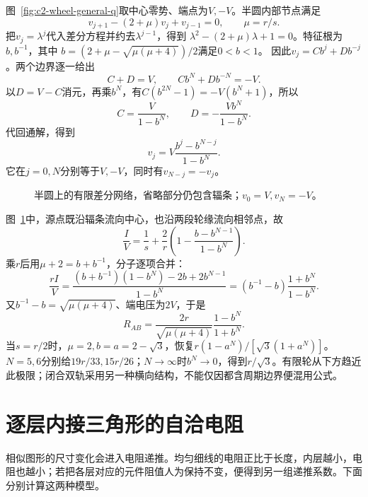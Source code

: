 \begin{solution}
图~\ref{fig:c2-wheel-general-q}取中心零势、端点为$V,-V$。半圆内部节点满足
\[
 v_{j+1}-(2+\mu)v_j+v_{j-1}=0,\qquad\mu=r/s.
\]
把$v_j=\lambda^j$代入差分方程并约去$\lambda^{j-1}$，得到
$\lambda^2-(2+\mu)\lambda+1=0$。特征根为$b,b^{-1}$，其中
$b=(2+\mu-\sqrt{\mu(\mu+4)})/2$满足$0<b<1$。
因此$v_j=C b^j+D b^{-j}$。两个边界逐一给出
\[
 C+D=V,\qquad Cb^N+Db^{-N}=-V.
\]
以$D=V-C$消元，再乘$b^N$，有$C(b^{2N}-1)=-V(b^N+1)$，所以
\[
 C=\frac{V}{1-b^N},\qquad D=-\frac{Vb^N}{1-b^N}.
\]
代回通解，得到
\[
 v_j=V\frac{b^j-b^{N-j}}{1-b^N}.
\]
它在$j=0,N$分别等于$V,-V$，同时有$v_{N-j}=-v_j$。
\begin{figure}[H]\centering
{}
\caption{半圆上的有限差分网络，省略部分仍包含辐条；$v_0=V,v_N=-V$。}\label{fig:c2-wheel-general-s}
\end{figure}
图~\ref{fig:c2-wheel-general-s}中，源点既沿辐条流向中心，也沿两段轮缘流向相邻点，故
\[
 \frac IV=\frac1s+\frac2r\left(1-\frac{b-b^{N-1}}{1-b^N}\right).
\]
乘$r$后用$\mu+2=b+b^{-1}$，分子逐项合并：
\[
 \frac{rI}V=
 \frac{(b+b^{-1})(1-b^N)-2b+2b^{N-1}}{1-b^N}
 =(b^{-1}-b)\frac{1+b^N}{1-b^N}.
\]
又$b^{-1}-b=\sqrt{\mu(\mu+4)}$、端电压为$2V$，于是
\[
 \boxed{R_{AB}=\frac{2r}{\sqrt{\mu(\mu+4)}}\frac{1-b^N}{1+b^N}}.
\]
当$s=r/2$时，$\mu=2,b=a=2-\sqrt3$，恢复$r(1-a^N)/[\sqrt3(1+a^N)]$。$N=5,6$分别给$19r/33,15r/26$；$N\to\infty$时$b^N\to0$，得到$r/\sqrt3$。有限轮从下方趋近此极限；闭合双轨采用另一种横向结构，不能仅因都含周期边界便混用公式。
\end{solution}


\section{逐层内接三角形的自洽电阻}
相似图形的尺寸变化会进入电阻递推。均匀细线的电阻正比于长度，内层越小，电阻也越小；若把各层对应的元件阻值人为保持不变，便得到另一组递推系数。下面分别计算这两种模型。

